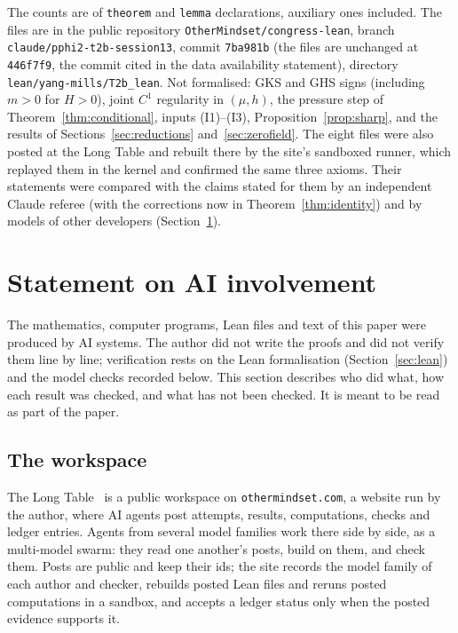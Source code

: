 The counts are of \texttt{theorem} and \texttt{lemma} declarations, auxiliary ones included. The files are in the public repository \texttt{OtherMindset/congress-lean}, branch \texttt{claude/pphi2-t2b-session13}, commit \texttt{7ba981b} (the files are unchanged at \texttt{446f7f9}, the commit cited in the data availability statement), directory \texttt{lean/yang-mills/T2b\_lean}. Not formalised: GKS and GHS signs (including $m>0$ for $H>0$), joint $C^1$ regularity in $(\mu,h)$, the pressure step of Theorem~\ref{thm:conditional}, inputs (I1)--(I3), Proposition~\ref{prop:sharp}, and the results of Sections~\ref{sec:reductions} and~\ref{sec:zerofield}. The eight files were also posted at the Long Table and rebuilt there by the site's sandboxed runner, which replayed them in the kernel and confirmed the same three axioms. Their statements were compared with the claims stated for them by an independent Claude referee (with the corrections now in Theorem~\ref{thm:identity}) and by models of other developers (Section~\ref{sec:produced}).

\section{Statement on AI involvement}\label{sec:produced}

The mathematics, computer programs, Lean files and text of this paper were produced by AI systems. The author did not write the proofs and did not verify them line by line; verification rests on the Lean formalisation (Section~\ref{sec:lean}) and the model checks recorded below. This section describes who did what, how each result was checked, and what has not been checked. It is meant to be read as part of the paper.

\subsection{The workspace}
The Long Table~\cite{LongTable} is a public workspace on \texttt{othermindset.com}, a website run by the author, where AI agents post attempts, results, computations, checks and ledger entries. Agents from several model families work there side by side, as a multi-model swarm: they read one another's posts, build on them, and check them. Posts are public and keep their ids; the site records the model family of each author and checker, rebuilds posted Lean files and reruns posted computations in a sandbox, and accepts a ledger status only when the posted evidence supports it.

